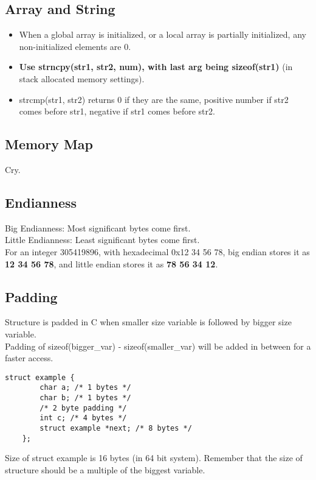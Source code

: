 \documentclass{article}
\begin{document}
\subsection{Array and String}
\begin{itemize}
    \item When a global array is initialized, or a local array is partially initialized, any non-initialized elements are 0.
    \item \textbf{Use strncpy(str1, str2, num), with last arg being sizeof(str1)} (in stack allocated memory settings).
    \item strcmp(str1, str2) returns 0 if they are the same, positive number if str2 comes before str1, negative if str1 comes before str2.
\end{itemize}

\subsection{Memory Map}
Cry.

\subsection{Endianness}
Big Endianness: Most significant bytes come first.\\ 
Little Endianness: Least significant bytes come first.\\
For an integer 305419896, with hexadecimal 0x12 34 56 78, big endian stores it as \textbf{12 34 56 78}, and little endian stores it as \textbf{78 56 34 12}.

\subsection{Padding}
Structure is padded in C when smaller size variable is followed by bigger size variable.\\
Padding of sizeof(bigger\_var) - sizeof(smaller\_var) will be added in between for a faster access.
\begin{lstlisting}[style=CStyle]
    struct example {
        char a; /* 1 bytes */
        char b; /* 1 bytes */
        /* 2 byte padding */
        int c; /* 4 bytes */
        struct example *next; /* 8 bytes */
    };
\end{lstlisting}
Size of struct example is 16 bytes (in 64 bit system). Remember that the size of structure should be a multiple of the biggest variable.
\end{document}
